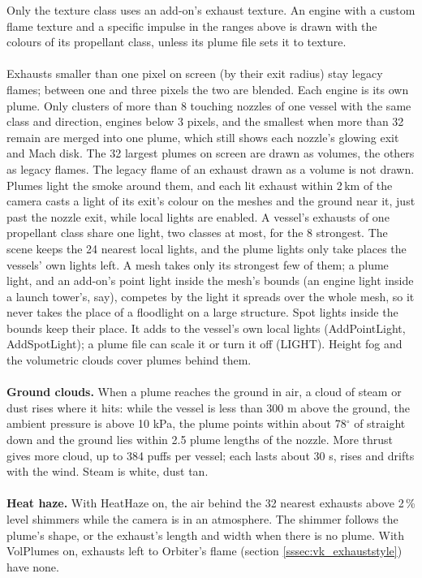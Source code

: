 \documentclass[Orbiter Developer Manual.tex]{subfiles}
\begin{document}
\begin{sloppypar}
\noindent
Only the texture class uses an add-on's exhaust texture. An engine with a custom flame texture and a specific impulse in the ranges above is drawn with the colours of its propellant class, unless its plume file sets it to texture.\\
\\
Exhausts smaller than one pixel on screen (by their exit radius) stay legacy flames; between one and three pixels the two are blended. Each engine is its own plume. Only clusters of more than 8 touching nozzles of one vessel with the same class and direction, engines below 3 pixels, and the smallest when more than 32 remain are merged into one plume, which still shows each nozzle's glowing exit and Mach disk. The 32 largest plumes on screen are drawn as volumes, the others as legacy flames. The legacy flame of an exhaust drawn as a volume is not drawn. Plumes light the smoke around them, and each lit exhaust within 2\,km of the camera casts a light of its exit's colour on the meshes and the ground near it, just past the nozzle exit, while local lights are enabled. A vessel's exhausts of one propellant class share one light, two classes at most, for the 8 strongest. The scene keeps the 24 nearest local lights, and the plume lights only take places the vessels' own lights left. A mesh takes only its strongest few of them; a plume light, and an add-on's point light inside the mesh's bounds (an engine light inside a launch tower's, say), competes by the light it spreads over the whole mesh, so it never takes the place of a floodlight on a large structure. Spot lights inside the bounds keep their place. It adds to the vessel's own local lights (AddPointLight, AddSpotLight); a plume file can scale it or turn it off (LIGHT). Height fog and the volumetric clouds cover plumes behind them.\\
\\
\textbf{Ground clouds.} When a plume reaches the ground in air, a cloud of steam or dust rises where it hits: while the vessel is less than 300 m above the ground, the ambient pressure is above 10 kPa, the plume points within about 78$^{\circ}$ of straight down and the ground lies within 2.5 plume lengths of the nozzle. More thrust gives more cloud, up to 384 puffs per vessel; each lasts about 30 s, rises and drifts with the wind. Steam is white, dust tan.\\
\\
\textbf{Heat haze.} With HeatHaze on, the air behind the 32 nearest exhausts above 2\,\% level shimmers while the camera is in an atmosphere. The shimmer follows the plume's shape, or the exhaust's length and width when there is no plume. With VolPlumes on, exhausts left to Orbiter's flame (section \ref{sssec:vk_exhauststyle}) have none.



\end{sloppypar}
\end{document}
